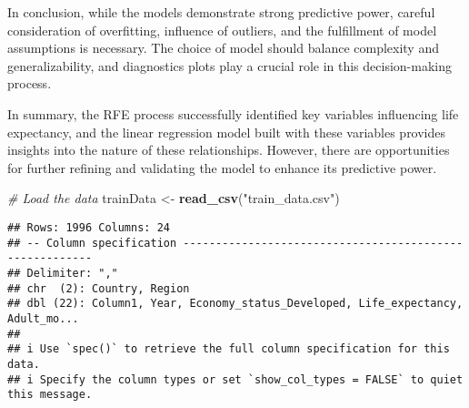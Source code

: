 \documentclass[
]{article}
\newenvironment{Shaded}{\begin{snugshade}}{\end{snugshade}}
\newcommand{\AttributeTok}[1]{\textcolor[rgb]{0.13,0.29,0.53}{#1}}
\newcommand{\CommentTok}[1]{\textcolor[rgb]{0.56,0.35,0.01}{\textit{#1}}}
\newcommand{\DecValTok}[1]{\textcolor[rgb]{0.00,0.00,0.81}{#1}}
\newcommand{\FunctionTok}[1]{\textcolor[rgb]{0.13,0.29,0.53}{\textbf{#1}}}
\newcommand{\NormalTok}[1]{#1}
\newcommand{\OtherTok}[1]{\textcolor[rgb]{0.56,0.35,0.01}{#1}}
\newcommand{\SpecialCharTok}[1]{\textcolor[rgb]{0.81,0.36,0.00}{\textbf{#1}}}
\newcommand{\StringTok}[1]{\textcolor[rgb]{0.31,0.60,0.02}{#1}}
\begin{document}
In conclusion, while the models demonstrate strong predictive power,
careful consideration of overfitting, influence of outliers, and the
fulfillment of model assumptions is necessary. The choice of model
should balance complexity and generalizability, and diagnostics plots
play a crucial role in this decision-making process.

In summary, the RFE process successfully identified key variables
influencing life expectancy, and the linear regression model built with
these variables provides insights into the nature of these
relationships. However, there are opportunities for further refining and
validating the model to enhance its predictive power.

\begin{Shaded}
\begin{Highlighting}[]
\CommentTok{\# Load the data}
\NormalTok{trainData }\OtherTok{\textless{}{-}} \FunctionTok{read\_csv}\NormalTok{(}\StringTok{"train\_data.csv"}\NormalTok{)}
\end{Highlighting}
\end{Shaded}

\begin{verbatim}
## Rows: 1996 Columns: 24
## -- Column specification --------------------------------------------------------
## Delimiter: ","
## chr  (2): Country, Region
## dbl (22): Column1, Year, Economy_status_Developed, Life_expectancy, Adult_mo...
## 
## i Use `spec()` to retrieve the full column specification for this data.
## i Specify the column types or set `show_col_types = FALSE` to quiet this message.
\end{verbatim}

\begin{Shaded}
\end{Shaded}
\end{document}
